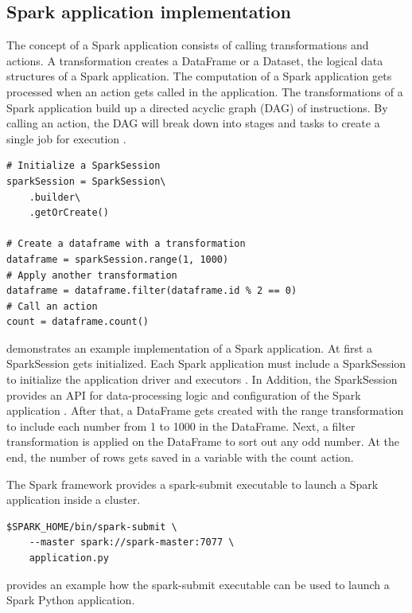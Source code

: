 \subsection{Spark application implementation}
The concept of a Spark application consists of calling transformations and actions. A transformation creates a DataFrame or a Dataset, the logical data structures of a Spark application. The computation of a Spark application gets processed when an action gets called in the application. The transformations of a Spark application build up a directed acyclic graph (DAG) of instructions. By calling an action, the DAG will break down into stages and tasks to create a single job for execution \cite{Chambers2018Spark}.
\begin{lstlisting}[frame=single, label=lst:spark_python_example, caption=Example of a Python3 Spark application, captionpos=b]
# Initialize a SparkSession
sparkSession = SparkSession\
    .builder\
    .getOrCreate()

# Create a dataframe with a transformation
dataframe = sparkSession.range(1, 1000)
# Apply another transformation
dataframe = dataframe.filter(dataframe.id % 2 == 0)
# Call an action
count = dataframe.count()
\end{lstlisting}
 demonstrates an example implementation of a Spark application. At first a SparkSession gets initialized. Each Spark application must include a SparkSession to initialize the application driver and executors  \cite{Chambers2018Spark}. In Addition, the SparkSession provides an API for data-processing logic and configuration of the Spark application \cite{Hien2018Spark}. After that, a DataFrame gets created with the range transformation to include each number from 1 to 1000 in the DataFrame. Next, a filter transformation is applied on the DataFrame to sort out any odd number. At the end, the number of rows gets saved in a variable with the count action.
\todo{Create listing macro}



The Spark framework provides a spark-submit executable to launch a Spark application inside a cluster.
\begin{lstlisting}[frame=single, label=lst:spark_submit_example, caption=Execution of a Spark Python application using the spark-submit executable, captionpos=b]
$SPARK_HOME/bin/spark-submit \
    --master spark://spark-master:7077 \
    application.py
\end{lstlisting}
\Lst{lst:spark_submit_example} provides an example how the spark-submit executable can be used to launch a Spark Python application.


